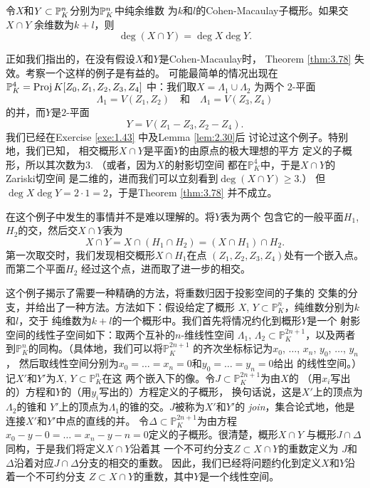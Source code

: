 \begin{thm}
\label{thm:3.78}
令$X$和$Y\subset \P_K^n$分别为$\P_K^n$中纯余维数
为$k$和$l$的Cohen-Macaulay子概形。如果交$X\cap Y$
余维数为$k+l$，则
\[
	\deg(X\cap Y)=\deg X\deg Y.
\]
\end{thm}


\begin{exa}\label{exa:3.79}
正如我们指出的，在没有假设$X$和$Y$是Cohen-Macaulay时，
Theorem \ref{thm:3.78} 失效。考察一个这样的例子是有益的。
可能最简单的情况出现在 $\mathbb P_K^4=\proj K[Z_0,Z_1,Z_2,Z_3,Z_4]$
中：我们取$X=\Lambda_1\cup \Lambda_2$ 为两个
$2$-平面
\[
	\Lambda_1=V(Z_1,Z_2)\quad \text{和}\quad
	\Lambda_1=V(Z_3,Z_4)
\]
的并，而$Y$是$2$-平面
\[
	Y=V(Z_1-Z_3,Z_2-Z_4).
\]
我们已经在Exercise \ref{exe:1.43} 中及Lemma \ref{lem:2.30}后
讨论过这个例子。特别地，我们已知，
相交概形$X\cap Y$是平面$Y$的由原点的极大理想的平方
定义的子概形，所以其次数为$3$. （或者，因为$X$的射影切空间
都在$\mathbb P_K^4$中\nottran ，于是$X\cap Y$的Zariski切空间
是二维的，进而我们可以立刻看到$\deg(X\cap Y)\geq 3$.）
但$\deg X\deg Y=2\cdot 1=2$，于是Theorem \ref{thm:3.78} 并不成立。
\end{exa}

在这个例子中发生的事情并不是难以理解的。将$Y$表为两个
包含它的一般平面$H_1$, $H_2$的交，然后交$X\cap Y$表为
\[
	X\cap Y=X\cap(H_1\cap H_2)=(X\cap H_1)\cap H_2.
\]
第一次取交时，我们发现相交概形$X\cap H_1$在点
$(Z_1,Z_2,Z_3,Z_4)$处有一个嵌入点。而第二个平面$H_2$
经过这个点，进而取了进一步的相交。 

\vspace{1ex}

这个例子揭示了需要一种精确的方法，将重数归因于投影空间的子集的
交集的分支，并给出了一种方法。方法如下：假设给定了概形
$X$, $Y\subset \mathbb P_K^n$，纯维数分别为$k$和$l$，交于
纯维数为$k+l$的一个概形中。我们首先将情况约化到概形$Y$是一个
射影空间的线性子空间如下：取两个互补的$n$-维线性空间
$\Lambda_1$, $\Lambda_2\subset \mathbb P_K^{2n+1}$，以及两者
到$\mathbb P_K^n$的同构。（具体地，我们可以将$\mathbb P_K^{2n+1}$
的齐次坐标标记为$x_0$, $\dots$, $x_n$, $y_0$, $\dots$, $y_n$，
然后取线性空间分别为$x_0=\dots=x_n=0$和$y_0=\dots=y_n=0$给出
的线性空间。）记$X'$和$Y'$为$X$, $Y\subset \mathbb P_K^n$在这
两个嵌入下的像。令$J\subset \mathbb P_K^{2n+1}$为由$X$的
（用$x_i$写出的）方程和$Y$的（用$y_i$写出的）方程定义的子概形，
换句话说，这是$X'$上的顶点为$\Lambda_2$的锥和
$Y'$上的顶点为$\Lambda_1$的锥的交。$J$被称为$X'$和$Y'$的
\textit{join}，集合论式地，他是连接$X'$和$Y'$中点的直线的并。
令$\Delta\subset \mathbb P_K^{2n+1}$为由方程
$x_0-y-0=\dots=x_n-y-n=0$定义的子概形。很清楚，概形$X\cap Y$
与概形$J\cap \Delta$同构，于是我们将定义$X\cap Y$沿着其
一个不可约分支$Z\subset X\cap Y$的重数定义为
$J$和$\Delta$沿着对应$J\cap \Delta$分支的相交的重数。
因此，我们已经将问题约化到定义$X$和$Y$沿着一个不可约分支
$Z\subset X\cap Y$的重数，其中$Y$是一个线性空间。

